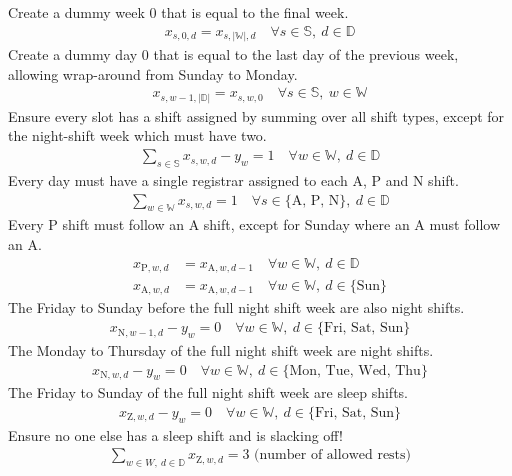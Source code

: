 \documentclass[a4paper]{article}
\begin{document}
Create a dummy week 0 that is equal to the final week.
\begin{align}
  x_{s, 0, d} = x_{s, |\mathbb{W}|, d} \quad\forall s\in \mathbb{S},\ d\in \mathbb{D}
\end{align}
Create a dummy day 0 that is equal to the last day of the previous week, allowing wrap-around from Sunday to Monday.
\begin{align}
  x_{s, w-1, |\mathbb{D}|} = x_{s, w, 0} \quad\forall s\in \mathbb{S},\ w\in \mathbb{W}
\end{align}
Ensure every slot has a shift assigned by summing over all shift types, except for the night-shift week which must have two.
\begin{align}
  \sum_{s\in \mathbb{S}} x_{s, w, d} - y_w = 1 \quad\forall w\in \mathbb{W},\ d\in \mathbb{D}
\end{align}
Every day must have a single registrar assigned to each A, P and N shift.
\begin{align}
  \sum_{w\in \mathbb{W}} x_{s, w, d} = 1 \quad\forall s\in \{\text{A, P, N}\},\ d\in \mathbb{D}
\end{align}
Every P shift must follow an A shift, except for Sunday where an A must follow an A.
\begin{align}
  x_{\text{P}, w, d} &= x_{\text{A}, w, d-1} \quad\forall w\in \mathbb{W},\ d\in \mathbb{D}\\
  x_{\text{A}, w, d} &= x_{\text{A}, w, d-1} \quad\forall w\in \mathbb{W},\ d\in \{\text{Sun}\}
\end{align}
The Friday to Sunday before the full night shift week are also night shifts.
\begin{align}
  x_{\text{N}, w-1, d} - y_w = 0 \quad\forall w\in \mathbb{W},\ d\in \{\text{Fri, Sat, Sun}\}
\end{align}
The Monday to Thursday of the full night shift week are night shifts.
\begin{align}
  x_{\text{N}, w, d} - y_w = 0 \quad\forall w\in \mathbb{W},\ d\in \{\text{Mon, Tue, Wed, Thu}\}
\end{align}
The Friday to Sunday of the full night shift week are sleep shifts.
\begin{align}
  x_{\text{Z}, w, d} - y_w = 0 \quad\forall w\in \mathbb{W},\ d\in \{\text{Fri, Sat, Sun}\}
\end{align}
Ensure no one else has a sleep shift and is slacking off!
\begin{align}
  \sum_{w\in W,\ d\in \mathbb{D}} x_{\text{Z}, w, d} = 3 \text{ (number of allowed rests)}
\end{align}
\end{document}
